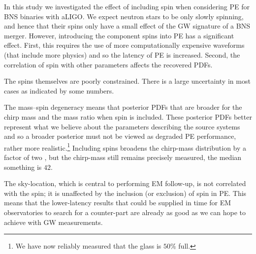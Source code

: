 In this study we investigated the effect of including spin when considering PE for BNS binaries with aLIGO. We expect neutron stars to be only slowly spinning, and hence that their spins only have a small effect of the GW signature of a BNS merger. However, introducing the component spins into PE has a significant effect. First, this requires the use of more computationally expensive waveforms (that include more physics) and so the latency of PE is increased. Second, the correlation of spin with other parameters affects the recovered PDFs.

The spins themselves are poorly constrained. There is a large uncertainty in most cases as indicated by some numbers.

The mass--spin degeneracy means that posterior PDFs that are broader for the chirp mass and the mass ratio when spin is included. These posterior PDFs better represent what we believe about the parameters describing the source systems and so a broader posterior must not be viewed as degraded PE performance, rather more realistic.\footnote{We have now reliably measured that the glass is $50\%$ full.} Including spins broadens the chirp-mass distribution by a factor of two \citep{Poisson_1995,Berry_2014}, but the chirp-mass still remains precisely measured, the median something is $42$.

The sky-location, which is central to performing EM follow-up, is not correlated with the spin; it is unaffected by the inclusion (or exclusion) of spin in PE. This means that the lower-latency results that could be supplied in time for EM observatories to search for a counter-part are already as good as we can hope to achieve with GW measurements.